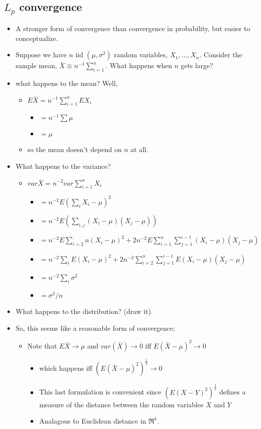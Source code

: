 \subsection{$L_p$ convergence}
\begin{itemize}
\item A stronger form of convergence than convergence in probability,
        but easier to conceptualize.
\item Suppose we have $n$ iid $(\mu, \sigma^2)$ random variables,
        $X_1,\dots,X_n$.  Consider the sample mean, $\bar X \equiv
        n^{-1} \sum_{i=1}^n$.  What happens when $n$ gets large?
\item what happens to the mean?  Well,
\begin{itemize}
\item $E \bar X = n^{-1} \sum_{i=1}^n E X_i$
\begin{itemize}
\item $= n^{-1} \sum \mu$
\item $= \mu$
\end{itemize}
\item so the mean doesn't depend on $n$ at all.
\end{itemize}
\item What happens to the variance?
\begin{itemize}
\item $var \bar X = n^{-2} var \sum_{i=1}^n X_i$
\begin{itemize}
\item $= n^{-2} E(\sum_i X_i - \mu)^2$
\item $= n^{-2} E\left(\sum_{i,j} (X_i - \mu)(X_j - \mu)\right)$
\item $= n^{-2} E \sum_{i=2}n (X_i - \mu)^2 + 2 n^{-2} E \sum_{i = 1}^n
            \sum_{j = 1}^{i-1} (X_i - \mu) (X_j - \mu)$
\item $= n^{-2} \sum_{i} E(X_i - \mu)^2 +  2 n^{-2} \sum_{i = 2}^n
            \sum_{j = 1}^{i-1} E (X_i - \mu) (X_j - \mu)$
\item $= n^{-2}\sum_i \sigma^2$
\item $= \sigma^2/n$
\end{itemize}
\end{itemize}
\item What happens to the distribution? (draw it).
\item So, this seems like a reasonable form of convergence;
\begin{itemize}
\item Note that $E \bar X \to \mu$ and $var(\bar X) \to 0$ iff
          $E(\bar X - \mu)^2 \to 0$
\begin{itemize}
\item which happens iff $(E(\bar X - \mu)^2)^{\frac12} \to 0$
\item This last formulation is convenient since
            $(E(X-Y)^2)^{\frac12}$ defines a measure of the distance
            between the random variables $X$ and $Y$
\item Analagous to Euclidean distance in $\Re^k$.
\end{itemize}
\end{itemize}
\end{itemize}

